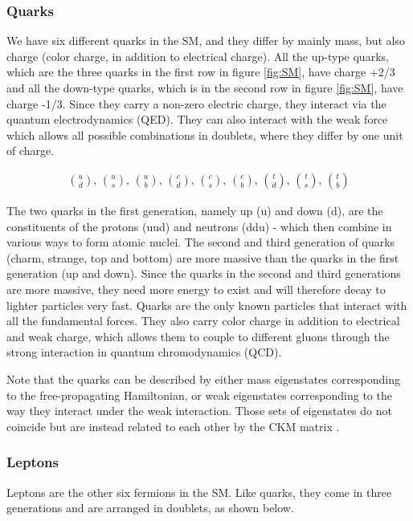 \subsubsection{Quarks}
We have six different quarks \cite{thomson} in the SM, and they differ by mainly mass, but also charge (color charge, in addition to electrical charge). All the up-type quarks, which are the three quarks in the first row in figure \ref{fig:SM}, have charge +2/3 and all the down-type quarks, which is in the second row in figure \ref{fig:SM}, have charge -1/3. Since they carry a non-zero electric charge, they interact via the quantum electrodynamics (QED). They can also interact with the weak force which allows all possible combinations in doublets, where they differ by one unit of charge. 

\begin{align}
    \binom{u}{d} \text{,  } \binom{u}{s} \text{,  } \binom{u}{b} \text{,  } \binom{c}{d} \text{,  } \binom{c}{s} \text{,  } \binom{c}{b} \text{,  } \binom{t}{d} \text{,  } \binom{t}{s} \text{,  } \binom{t}{b}
\end{align}

The two quarks in the first generation, namely up (u) and down (d), are the constituents of the protons (uud) and neutrons (ddu) - which then combine in various ways to form atomic nuclei. The second and third generation of quarks (charm, strange, top and bottom) are more massive than the quarks in the first generation (up and down). Since the quarks in the second and third generations are more massive, they need more energy to exist and will therefore decay to lighter particles very fast. Quarks are the only known particles that interact with all the fundamental forces. They also carry color charge in addition to electrical and weak charge, which allows them to couple to different gluons through the strong interaction in quantum chromodynamics (QCD).  

Note that the quarks can be described by either mass eigenstates corresponding to the free-propagating Hamiltonian, or weak eigenstates corresponding to the way they interact under the weak interaction. Those sets of eigenstates do not coincide but are instead related to each other by the CKM matrix \cite{thomson}. 




\subsubsection{Leptons}
Leptons are the other six fermions in the SM. Like quarks, they come in three generations and are arranged in doublets, as shown below.

